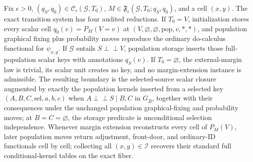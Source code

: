 Fix \(\epsilon>0\), \((q_S,q_0)\in\mathcal C_{\epsilon}(\mathcal G,T_0)\), \(M\in\mathfrak F_{\epsilon}(\mathcal G,T_0;q_S,q_0)\), and a cell \((x,y)\). The exact transition system has four audited reductions. If \(T_0=V\), initialization stores every scalar cell \(q_0(v)=P_M(V=v)\) at \((V,\varnothing,\varnothing,\mathrm{pop},v,\ast,\ast)\), and population graphical fixing plus probability moves reproduce the ordinary do-calculus functional for \(\psi_{x,y}\). If \(\mathcal G\) entails \(S\perp\!\!\!\perp V\), population storage inserts those full-population scalar keys with annotations \(q_S(v)\). If \(T_0=\varnothing\), the external-margin law is trivial, its scalar unit creates no key, and no margin-extension instance is admissible. The resulting boundary is the selected-source scalar closure augmented by exactly the population kernels inserted from a selected key \((A,B,C,\mathrm{sel},a,b,c)\) when \(A\perp\!\!\!\perp S\mid B,C\) in \(G_{\overline B}\), together with their consequences under the unchanged population graphical-fixing and probability moves; at \(B=C=\varnothing\), the storage predicate is unconditional selection independence. Whenever margin extension reconstructs every cell of \(P_M(V)\), later population moves return adjustment, front-door, and ordinary-ID functionals cell by cell; collecting all \((x,y)\in\mathcal I\) recovers their standard full conditional-kernel tables on the exact fiber.
